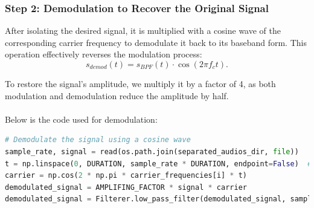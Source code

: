 \documentclass[12pt,a4paper]{article}
\begin{document}
\subsubsection{Step 2: Demodulation to Recover the Original Signal}
After isolating the desired signal, it is multiplied with a cosine wave of the corresponding carrier frequency to demodulate it back to its baseband form. This operation effectively reverses the modulation process:
\[ s_{demod}(t) = s_{BPF}(t) \cdot \cos(2\pi f_c t). \]

To restore the signal's amplitude, we multiply it by a factor of 4, as both modulation and demodulation reduce the amplitude by half. \\
\\
Below is the code used for demodulation:
\begin{lstlisting}[language=Python, caption=Demodulation Code]
# Demodulate the signal using a cosine wave
sample_rate, signal = read(os.path.join(separated_audios_dir, file))
t = np.linspace(0, DURATION, sample_rate * DURATION, endpoint=False)  # Time vector
carrier = np.cos(2 * np.pi * carrier_frequencies[i] * t)
demodulated_signal = AMPLIFING_FACTOR * signal * carrier
demodulated_signal = Filterer.low_pass_filter(demodulated_signal, sample_rate, LIMIT_FREQUENCY, FilterType.LOW_PASS_BUTTERWORTH)
\end{lstlisting}
\end{document}
